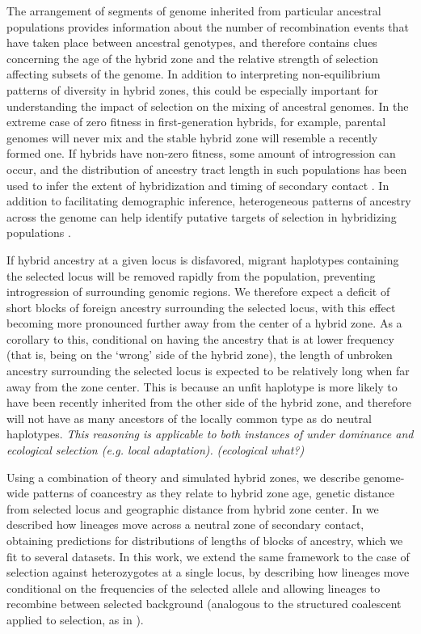 \documentclass[11pt,letterpaper]{article}
\newcommand{\alisa}[1]{{\em \color{red} #1}}
\newcommand{\plr}[1]{{\em \color{blue} #1}}
\begin{document}
The arrangement of segments of genome inherited from particular ancestral populations
provides information about the number of recombination events that have taken place between ancestral genotypes, 
and therefore contains clues concerning the age of the hybrid zone and the relative strength of selection affecting subsets of the genome. %
In addition to interpreting non-equilibrium patterns of diversity in hybrid zones, 
this could be especially important for understanding the impact of selection on the mixing of ancestral genomes. %
In the extreme case of zero fitness in first-generation hybrids, for example, parental genomes will never mix and the stable hybrid zone will resemble a recently formed one. 
If hybrids have non-zero fitness, some amount of introgression can occur, and the distribution of ancestry tract length in such populations has been used to infer the extent of hybridization and timing of secondary contact \citep{Price2009, Gravel2012}. 
In addition to facilitating demographic inference, heterogeneous patterns of ancestry across the genome can help identify putative targets of selection in hybridizing populations  \citep{Porter1997, Gompert2012}. 

If hybrid ancestry at a given locus is disfavored, migrant haplotypes containing the selected locus will be removed rapidly from the population, preventing introgression of surrounding genomic regions. We therefore expect a deficit of short blocks of foreign ancestry surrounding the selected locus, with this effect becoming more pronounced further away from the center of a hybrid zone. As a corollary to this, conditional on having the ancestry that is at lower frequency (that is, being on the `wrong' side of the hybrid zone), the length of unbroken ancestry surrounding the selected locus is expected to be relatively long when far away from the zone center.  This is because an unfit haplotype is more likely to have been recently inherited from the other side of the hybrid zone, and therefore will not have
as many ancestors of the locally common type as do neutral haplotypes. \alisa{This reasoning is applicable to both instances of under dominance and ecological selection (e.g. local adaptation).}
\plr{(ecological what?)}

Using a combination of theory and simulated hybrid zones, we describe genome-wide patterns of coancestry 
as they relate to hybrid zone age, genetic distance from selected locus and geographic distance from hybrid zone center. 
In \citet{sedghifar2015spatial} we described how lineages move across a neutral zone of secondary contact,
obtaining predictions for distributions of lengths of blocks of ancestry, which we fit to several datasets.
In this work, we extend the same framework to the case of selection against heterozygotes at a single locus,
by describing how lineages move conditional on the frequencies of the selected allele
and allowing lineages to recombine between selected background 
(analogous to the structured coalescent applied to selection, as in \citet{hudson1988coalescent}).
\end{document}
